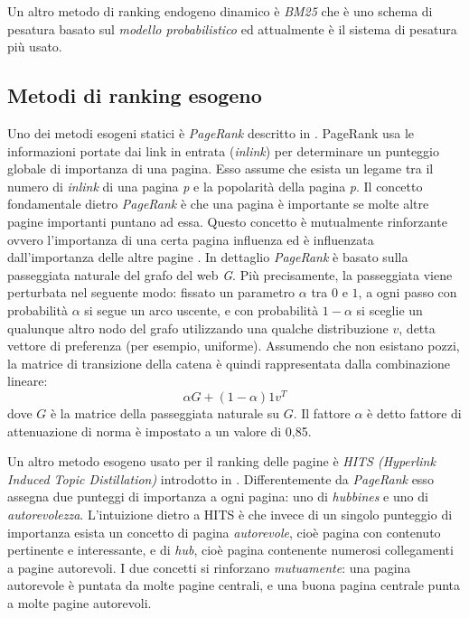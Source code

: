 Un altro metodo di ranking endogeno dinamico è \textit{BM25} \cite{Robertson:2009:PRF:1704809.1704810} che è uno schema di pesatura basato sul \textit{modello probabilistico} ed attualmente è il sistema di pesatura più usato. 

\subsection{Metodi di ranking esogeno}
Uno dei metodi esogeni statici è \textit{PageRank} descritto in \cite{ilprints422}. PageRank usa le informazioni portate dai link in entrata (\textit{inlink}) per determinare un punteggio globale di importanza di una pagina. Esso assume che esista un legame tra il numero di \textit{inlink} di una pagina \textit{p} e la popolarità della pagina \textit{p}. Il concetto fondamentale dietro \textit{PageRank} è che una pagina è importante se molte altre pagine importanti puntano ad essa. Questo concetto è mutualmente rinforzante ovvero l'importanza di una certa pagina influenza ed è influenzata dall'importanza delle altre pagine \cite{ilprints646}. In dettaglio \textit{PageRank} è basato sulla passeggiata naturale del grafo del web \textit{G}. Più precisamente, la passeggiata viene perturbata nel seguente modo: fissato un parametro \(\alpha\) tra \(0\) e \(1\), a ogni passo con probabilità \(\alpha\) si segue un arco uscente, e con probabilità \(1- \alpha \) si sceglie un qualunque altro nodo del grafo utilizzando 
una 
qualche 
distribuzione \(v\), detta
vettore di preferenza (per esempio, uniforme). Assumendo che non esistano pozzi, la matrice di transizione della catena è quindi rappresentata dalla combinazione lineare:
\begin{equation}
 \alpha G + (1 - \alpha) 1 v^T
\end{equation}
dove \(G\) è la matrice della passeggiata naturale su \(G\). Il fattore \(\alpha\) è detto fattore di attenuazione di norma è impostato a un valore di 0,85.

Un altro metodo esogeno usato per il ranking delle pagine è \textit{HITS (Hyperlink Induced Topic Distillation)} introdotto in \cite{Kleinberg:1999:ASH:324133.324140}. Differentemente da \textit{PageRank} esso assegna due punteggi di importanza a ogni pagina: uno di \textit{hubbines} e uno di \textit{autorevolezza}. L’intuizione dietro a HITS è che invece di un singolo punteggio di importanza esista un concetto di pagina \textit{autorevole}, cioè pagina con contenuto pertinente e interessante, e di \textit{hub}, cioè pagina contenente numerosi collegamenti a pagine autorevoli. I due concetti si rinforzano \textit{mutuamente}: una pagina autorevole è puntata da molte pagine centrali, e una buona pagina centrale punta a molte pagine autorevoli.

